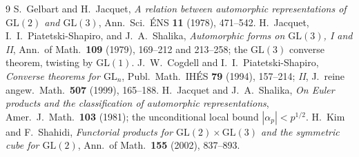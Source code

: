 \documentclass[11pt]{article}
\begin{document}
\begin{thebibliography}{9}
 S.~Gelbart and H.~Jacquet, \emph{A relation between automorphic representations of
$\mathrm{GL}(2)$ and $\mathrm{GL}(3)$}, Ann.\ Sci.\ \'ENS \textbf{11} (1978), 471--542.
 H.~Jacquet, I.~I.~Piatetski-Shapiro, and J.~A.~Shalika, \emph{Automorphic forms on
$\mathrm{GL}(3)$, I and II}, Ann.\ of Math.\ \textbf{109} (1979), 169--212 and 213--258; the
$\mathrm{GL}(3)$ converse theorem, twisting by $\mathrm{GL}(1)$.
 J.~W.~Cogdell and I.~I.~Piatetski-Shapiro, \emph{Converse theorems for
$\mathrm{GL}_n$}, Publ.\ Math.\ IH\'ES \textbf{79} (1994), 157--214; \emph{II}, J.\ reine angew.\
Math.\ \textbf{507} (1999), 165--188.
 H.~Jacquet and J.~A.~Shalika, \emph{On Euler products and the classification of
automorphic representations}, Amer.\ J.\ Math.\ \textbf{103} (1981); the unconditional local
bound $|\alpha_p|<p^{1/2}$.
 H.~Kim and F.~Shahidi, \emph{Functorial products for
$\mathrm{GL}(2)\times\mathrm{GL}(3)$ and the symmetric cube for $\mathrm{GL}(2)$}, Ann.\ of Math.\
\textbf{155} (2002), 837--893.
\end{thebibliography}
\end{document}
